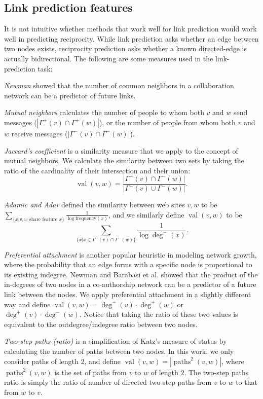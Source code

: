 \documentclass[conference]{IEEEtran}
\begin{document}
\subsection{Link prediction features}

It is not intuitive whether methods that work well for link prediction would work well in predicting reciprocity. 
While link prediction asks whether an edge between two nodes exists, reciprocity prediction asks whether a known directed-edge is actually bidirectional.
The following are some measures used in the link-prediction task:

\emph{Newman} \cite{graph:common-neighbors} showed that the number of common neighbors in a collaboration network can be a predictor of future links. 

\emph{Mutual neighbors} calculates the number of people to whom both $v$ and $w$ send messages ($|\Gamma^+(v) \cap \Gamma^+(w)|$), or the number of people from whom both $v$ and $w$ receive messages ($|\Gamma^-(v) \cap \Gamma^-(w)|$).

\emph{Jaccard's coefficient} \cite{Salton:86} is a similarity measure
that we apply to the concept of mutual neighbors. We calculate the
similarity between two sets by taking the ratio of the cardinality of
their intersection and their union: \[\operatorname{val}(v,w) =
\frac{|\Gamma^-(v) \cap \Gamma^-(w)|}{|\Gamma^-(v) \cup
\Gamma^-(w)|}.\]

\emph{Adamic and Adar} \cite{Adamic:2003ud} defined the similarity between web sites $v,w$ to be $ \sum_{\{x|v,w \text{ share feature }x\}} \frac{1}{\log{\text{frequency}(x)}} $, and we similarly define $\operatorname{val}(v,w)$ to be \[ \sum_{\{x|x \in \Gamma^-(v) \cap \Gamma^-(w)\}} \frac{1}{\log{\deg^-(x)}} .\]

\emph{Preferential attachment} is another popular heuristic in modeling network growth, where the probability that an edge forms with a specific node is proportional to its existing indegree. Newman \cite{graph:common-neighbors} and Barabasi et al. \cite{Barabasi:2002} showed that the product of the in-degrees of two nodes in a co-authorship network can be a predictor of a future link between the nodes. We apply preferential attachment in a slightly different way and define  $\operatorname{val}(v,w) = \deg^-(v)\cdot \deg^+(w)$ or $\deg^+(v)\cdot \deg^-(w)$. 
Notice that taking the ratio of these two values is equivalent to the outdegree/indegree ratio between two nodes.

\emph{Two-step paths (ratio)} is a simplification of Katz's \cite{Katz:1953un} measure of status by calculating the number of paths between two nodes. 
In this work, we only consider paths of length 2, and define $\operatorname{val}(v,w) = |\operatorname{paths}^2(v,w)|$, where $\operatorname{paths}^2(v,w)$ is the set of paths from $v$ to $w$ of length $2$. 
The two-step paths ratio is simply the ratio of number of directed two-step paths from $v$ to $w$ to that from $w$ to $v$. 
\end{document}
